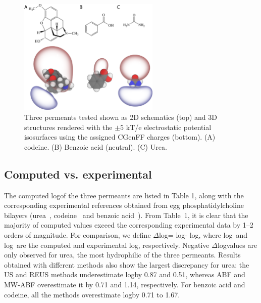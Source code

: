 \begin{figure}[htbp]
\begin{center}
\includegraphics[width=0.6\textwidth]{Figures/permeants1}
\caption[Structures of permeants urea, codeine, and benzoic acid along with electrostatic potential isosurfaces]{Three permeants tested shown as 2D schematics (top) and 3D structures rendered with the $\pm 5$ kT/e electrostatic potential isosurfaces
using the assigned CGenFF charges (bottom).  (A) codeine.  (B) Benzoic acid (neutral).  (C) Urea.}
\label{fig:permeants}
\end{center}
\end{figure}

\subsection{Computed vs. experimental \perm}
\par The computed log\perm of the three permeants are listed in Table 1, along with the corresponding experimental references obtained from egg phosphatidylcholine bilayers (urea~\cite{Gallucci1971}, codeine~\cite{Orbach1980} and  benzoic acid~\cite{Walter1984}). From Table~1, it is clear that the majority of computed \perm values exceed the corresponding experimental data by 1--2 orders of magnitude. For comparison, we define $\Delta$log\perm = log\permcom - log\permexp, where log\permcom~and log\permexp~are the computed and experimental log\perm, respectively. Negative $\Delta$log\perm values are only observed for urea, the most hydrophilic of the three permeants.  Results obtained with different methods also show the largest discrepancy for urea: the US and REUS  methods underestimate log\perm by 0.87 and 0.51, whereas ABF and MW-ABF overestimate it by 0.71 and 1.14, respectively. For benzoic acid and codeine, all the methods overestimate log\perm by 0.71 to 1.67.


